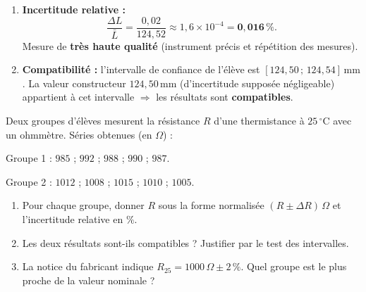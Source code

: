 \documentclass[11pt]{article}
\begin{document}
\begin{exoresolu}
\begin{enumerate}
\begin{itemize}
    \end{itemize}
    \item \textbf{Incertitude relative :}
    \[
    \frac{\Delta L}{\bar{L}} = \frac{0,02}{124,52} \approx 1,6 \times 10^{-4} = \mathbf{0,016\,\%}.
    \]
    Mesure de \textbf{très haute qualité} (instrument précis et répétition des mesures).
    \item \textbf{Compatibilité :} l'intervalle de confiance de l'élève est $[124,50\,;\,124,54]\,\text{mm}$. La valeur constructeur $124,50\,\text{mm}$ (d'incertitude supposée négligeable) appartient à cet intervalle $\Rightarrow$ les résultats sont \textbf{compatibles}.
\end{enumerate}
\end{exoresolu}

\begin{exercice}
Deux groupes d'élèves mesurent la résistance $R$ d'une thermistance à $25\,^\circ\text{C}$ avec un ohmmètre. Séries obtenues (en $\Omega$) :

Groupe 1 : $985$ ; $992$ ; $988$ ; $990$ ; $987$.

Groupe 2 : $1012$ ; $1008$ ; $1015$ ; $1010$ ; $1005$.
\begin{enumerate}
    \item Pour chaque groupe, donner $R$ sous la forme normalisée $(R \pm \Delta R)\,\Omega$ et l'incertitude relative en $\%$.
    \item Les deux résultats sont-ils compatibles ? Justifier par le test des intervalles.
    \item La notice du fabricant indique $R_{25} = 1000\,\Omega \pm 2\,\%$. Quel groupe est le plus proche de la valeur nominale ?
\end{enumerate}
\end{exercice}
\end{document}
